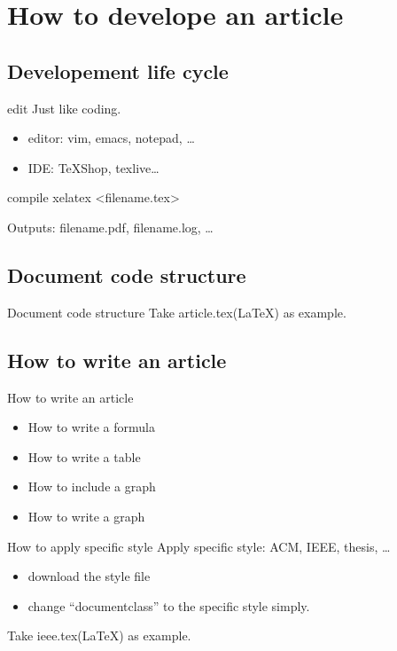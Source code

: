 \documentclass{beamer}
\begin{document}
\section{How to develope an article}
\subsection{Developement life cycle}
\begin{frame}{edit}
  Just like coding.
  \begin{itemize}
    \item editor: vim, emacs, notepad, \ldots
    \item IDE: TeXShop, texlive\ldots
  \end{itemize}
\end{frame}
\begin{frame}{compile}
  xelatex <filename.tex>

  Outputs: filename.pdf, filename.log, \ldots
\end{frame}
\subsection{Document code structure}
\begin{frame}{Document code structure}
  Take article.tex(\LaTeX) as example.
\end{frame}

\subsection{How to write an article}
\begin{frame}{How to write an article}
  \begin{itemize}
    \item How to write a formula
    \item  How to write a table
    \item   How to include a graph
    \item   How to write a graph
  \end{itemize}
\end{frame}
\begin{frame}{How to apply specific style}
  Apply specific style: ACM, IEEE, thesis, \ldots
  \begin{itemize}
    \item download the style file
    \item change ``documentclass'' to the specific style simply.
  \end{itemize}
  Take ieee.tex(\LaTeX) as example.
\end{frame}
\end{document}
